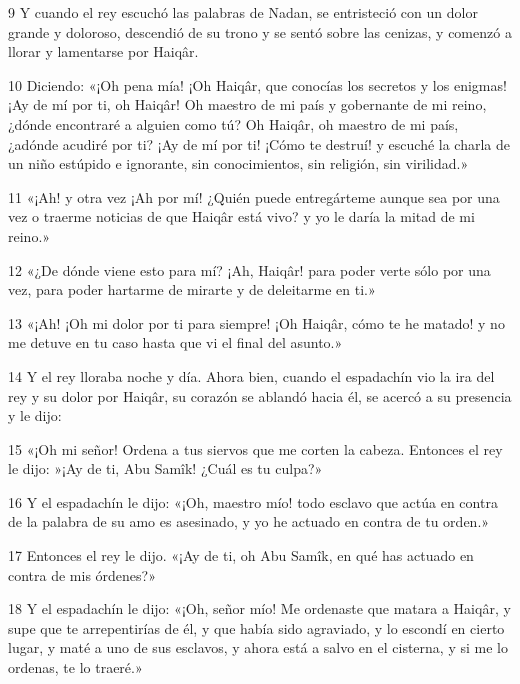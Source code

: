 \par 9 Y cuando el rey escuchó las palabras de Nadan, se entristeció con un dolor grande y doloroso, descendió de su trono y se sentó sobre las cenizas, y comenzó a llorar y lamentarse por Haiqâr.

\par 10 Diciendo: «¡Oh pena mía! ¡Oh Haiqâr, que conocías los secretos y los enigmas! ¡Ay de mí por ti, oh Haiqâr! Oh maestro de mi país y gobernante de mi reino, ¿dónde encontraré a alguien como tú? Oh Haiqâr, oh maestro de mi país, ¿adónde acudiré por ti? ¡Ay de mí por ti! ¡Cómo te destruí! y escuché la charla de un niño estúpido e ignorante, sin conocimientos, sin religión, sin virilidad.»

\par 11 «¡Ah! y otra vez ¡Ah por mí! ¿Quién puede entregárteme aunque sea por una vez o traerme noticias de que Haiqâr está vivo? y yo le daría la mitad de mi reino.»

\par 12 «¿De dónde viene esto para mí? ¡Ah, Haiqâr! para poder verte sólo por una vez, para poder hartarme de mirarte y de deleitarme en ti.»

\par 13 «¡Ah! ¡Oh mi dolor por ti para siempre! ¡Oh Haiqâr, cómo te he matado! y no me detuve en tu caso hasta que vi el final del asunto.»

\par 14 Y el rey lloraba noche y día. Ahora bien, cuando el espadachín vio la ira del rey y su dolor por Haiqâr, su corazón se ablandó hacia él, se acercó a su presencia y le dijo:

\par 15 «¡Oh mi señor! Ordena a tus siervos que me corten la cabeza. Entonces el rey le dijo: »¡Ay de ti, Abu Samîk! ¿Cuál es tu culpa?»

\par 16 Y el espadachín le dijo: «¡Oh, maestro mío! todo esclavo que actúa en contra de la palabra de su amo es asesinado, y yo he actuado en contra de tu orden.»

\par 17 Entonces el rey le dijo. «¡Ay de ti, oh Abu Samîk, en qué has actuado en contra de mis órdenes?»

\par 18 Y el espadachín le dijo: «¡Oh, señor mío! Me ordenaste que matara a Haiqâr, y supe que te arrepentirías de él, y que había sido agraviado, y lo escondí en cierto lugar, y maté a uno de sus esclavos, y ahora está a salvo en el cisterna, y si me lo ordenas, te lo traeré.»

